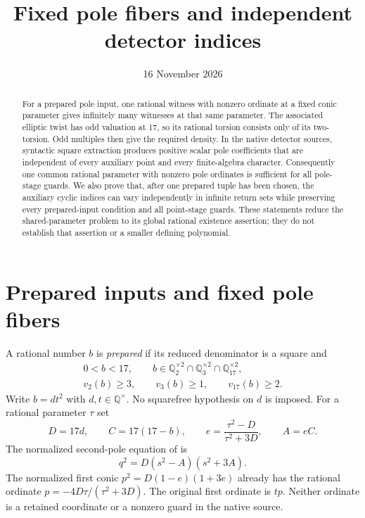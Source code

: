 \documentclass[11pt,a4paper]{article}
\title{Fixed pole fibers and independent detector indices}
\author{}\date{16 November 2026}
\theoremstyle{remark}\newtheorem{remark}[theorem]{Remark}
\newcommand{\Q}{\mathbb Q}\newcommand{\Z}{\mathbb Z}
\begin{document}
\maketitle
\begin{abstract}
For a prepared pole input, one rational witness with nonzero ordinate at
a fixed conic parameter gives infinitely many witnesses at that same
parameter. The associated elliptic twist has odd valuation at 17, so its
rational torsion consists only of its two-torsion. Odd multiples then give
the required density. In the native detector sources, syntactic square
extraction produces positive scalar pole coefficients that are independent
of every auxiliary point and every finite-algebra character. Consequently
one common rational parameter with nonzero pole ordinates is sufficient
for all pole-stage guards. We also prove that, after one prepared tuple has
been chosen, the auxiliary cyclic indices can vary independently in
infinite return sets while preserving every prepared-input condition and
all point-stage guards. These statements reduce the shared-parameter
problem to its global rational existence assertion; they do not establish
that assertion or a smaller defining polynomial.
\end{abstract}

\section{Prepared inputs and fixed pole fibers}

A rational number $b$ is \emph{prepared} if its reduced denominator is a
square and
\begin{equation}\label{eq:preparation}
\begin{gathered}
0<b<17,\qquad
b\in\Q_2^{\times2}\cap\Q_3^{\times2}\cap\Q_{17}^{\times2},\\
v_2(b)\ge3,\qquad v_3(b)\ge1,\qquad v_{17}(b)\ge2.
\end{gathered}
\end{equation}
Write $b=dt^2$ with $d,t\in\Q^\times$. No squarefree hypothesis on
$d$ is imposed. For a rational parameter $\tau$ set
\begin{equation}\label{eq:normalized}
 D=17d,\qquad C=17(17-b),\qquad
 e=\frac{\tau^2-D}{\tau^2+3D},\qquad A=eC.
\end{equation}
The normalized second-pole equation of \cite{UnitNorm} is
\begin{equation}\label{eq:pole}
                  q^2=D(s^2-A)(s^2+3A).
\end{equation}
The normalized first conic $p^2=D(1-e)(1+3e)$ already has the
rational ordinate $p=-4D\tau/(\tau^2+3D)$. The original first
ordinate is $tp$. Neither ordinate is a retained coordinate or a
nonzero guard in the native source.
\end{document}
